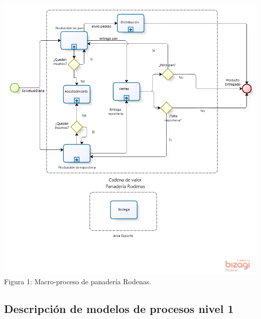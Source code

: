 \begin{center}
\includegraphics[width=15cm]{./imagenes/Macro_proceso.png}\\
Figura 1: Macro-proceso de panadería Rodenas.
\end{center}
\newpage
\subsection{Descripción de modelos de procesos nivel 1} 

